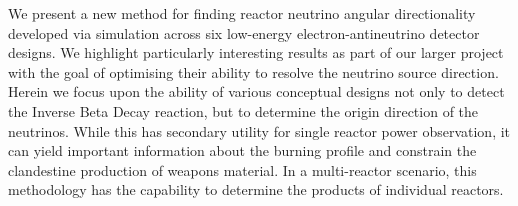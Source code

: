 

We present a new method for finding reactor neutrino angular directionality developed via simulation across six low-energy electron-antineutrino detector designs. We highlight particularly interesting results as part of our larger project with the
goal of optimising their ability to resolve the neutrino source direction. Herein we focus upon the ability of various conceptual designs not only to detect the Inverse Beta Decay reaction, but to determine the origin direction of the neutrinos.
While this has secondary utility for single reactor power observation, it can yield important information about the burning profile and constrain the clandestine production of weapons material. In a multi-reactor scenario, this methodology has the capability to determine the products of individual reactors. 






